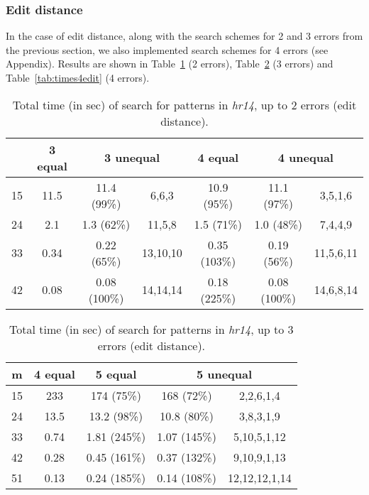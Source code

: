 \documentclass[12pt]{article}
\begin{document}
\subsubsection{Edit distance}

In the case of edit distance, along with the search schemes for 2 and
3 errors from the previous section, we also implemented search schemes
for 4 errors (see Appendix). 
Results are shown in Table~\ref{tab:times2edit} (2 errors),
Table~\ref{tab:times3edit} (3 errors) and
Table~\ref{tab:times4edit} (4 errors). 


\begin{table}[!tb]
\caption{Total time (in sec) of search for  patterns
in \emph{hr14}, up to 2 errors (edit distance).
\label{tab:times2edit}}
\centering
\begin{tabular}{|c|c|c|c|c|c|c|}
\hline
 & 3 equal & \multicolumn{2}{|c|}{3 unequal} & 4 equal & \multicolumn{2}{|c|}{4 unequal} \\
\hline
15 & 11.5 & 11.4 (99\%) & 6,6,3 & 10.9 (95\%) & 11.1 (97\%) & 3,5,1,6 \\
24 & 2.1 & 1.3 (62\%)  & 11,5,8 & 1.5 (71\%) & 1.0 (48\%) & 7,4,4,9 \\
33 & 0.34  & 0.22 (65\%)   & 13,10,10 & 0.35 (103\%)  & 0.19 (56\%) & 11,5,6,11 \\
42 & 0.08  & 0.08 (100\%)  & 14,14,14 & 0.18 (225\%)  & 0.08 (100\%) & 14,6,8,14 \\
\hline
\end{tabular}
\end{table}



\begin{table}[!tb]
\caption{Total time (in sec) of search for  patterns
  in \emph{hr14}, up to 3 errors (edit distance).
\label{tab:times3edit}}
\centering
\begin{tabular}{|c|c|c|c|c|}
\hline
m & 4 equal & 5 equal & \multicolumn{2}{|c|}{5 unequal} \\
\hline
15 & 233 & 174 (75\%) & 168 (72\%) & 2,2,6,1,4 \\
24 & 13.5 & 13.2 (98\%) & 10.8 (80\%) & 3,8,3,1,9 \\
33 & 0.74 & 1.81 (245\%) & 1.07 (145\%) & 5,10,5,1,12 \\
42 & 0.28 & 0.45 (161\%) & 0.37 (132\%) & 9,10,9,1,13 \\
51 & 0.13 & 0.24 (185\%) & 0.14 (108\%) & 12,12,12,1,14 \\
\hline
\end{tabular}
\end{table}
\end{document}
